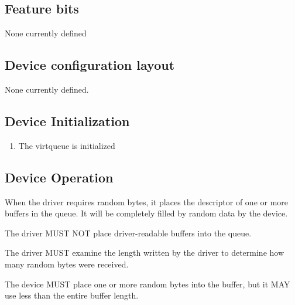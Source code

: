 \subsection{Feature bits}\label{sec:Device Types / Entropy Device / Feature bits}
  None currently defined

\subsection{Device configuration layout}\label{sec:Device Types / Entropy Device / Device configuration layout}
  None currently defined.

\subsection{Device Initialization}\label{sec:Device Types / Entropy Device / Device Initialization}

\begin{enumerate}
\item The virtqueue is initialized
\end{enumerate}

\subsection{Device Operation}\label{sec:Device Types / Entropy Device / Device Operation}

When the driver requires random bytes, it places the descriptor
of one or more buffers in the queue. It will be completely filled
by random data by the device.


The driver MUST NOT place driver-readable buffers into the queue.

The driver MUST examine the length written by the driver to determine
how many random bytes were received.


The device MUST place one or more random bytes into the buffer, but it
MAY use less than the entire buffer length.

